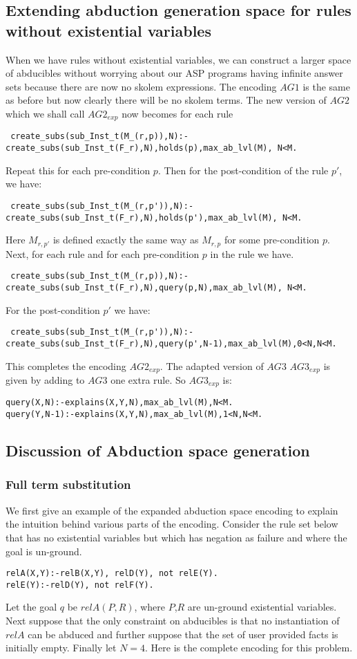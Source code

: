 \documentclass[sigconf]{acmart}
\begin{document}
\subsection{Extending abduction generation space for rules without existential variables}
When we have rules without existential variables, we can construct a larger space of abducibles without worrying about our ASP programs having infinite answer sets because there are now no skolem expressions. The encoding $AG1$ is the same as before but now clearly there will be no skolem terms. The new version of $AG2$ which we shall call $AG2_{exp}$ now becomes for each rule
\begin{verbatim}
 create_subs(sub_Inst_t(M_(r,p)),N):-create_subs(sub_Inst_t(F_r),N),holds(p),max_ab_lvl(M), N<M.   
\end{verbatim}
Repeat this for each pre-condition $p$. Then for the post-condition of the rule $p'$, we have:
\begin{verbatim}
 create_subs(sub_Inst_t(M_(r,p')),N):-create_subs(sub_Inst_t(F_r),N),holds(p'),max_ab_lvl(M), N<M.   
\end{verbatim}
Here $M_{r,p'}$ is defined exactly the same way as $M_{r,p}$ for some pre-condition $p$. Next, for each rule and for each pre-condition $p$ in the rule we have.
\begin{verbatim}
 create_subs(sub_Inst_t(M_(r,p)),N):-create_subs(sub_Inst_t(F_r),N),query(p,N),max_ab_lvl(M), N<M.   
\end{verbatim}
For the post-condition $p'$ we have:
\begin{verbatim}
 create_subs(sub_Inst_t(M_(r,p')),N):-create_subs(sub_Inst_t(F_r),N),query(p',N-1),max_ab_lvl(M),0<N,N<M.   
\end{verbatim}
This completes the encoding $AG2_{exp}$. The adapted version of $AG3$ $AG3_{exp}$ is given by adding to $AG3$ one extra rule. So $AG3_{exp}$ is:
\begin{verbatim}
query(X,N):-explains(X,Y,N),max_ab_lvl(M),N<M.
query(Y,N-1):-explains(X,Y,N),max_ab_lvl(M),1<N,N<M.
\end{verbatim}
\subsection{Discussion of Abduction space generation}
\subsubsection{Full term substitution}
We first give an example of the expanded abduction space encoding to explain the intuition behind various parts of the encoding. Consider the rule set below that has no existential variables but which has negation as failure and where the goal is un-ground. 
\begin{verbatim}
relA(X,Y):-relB(X,Y), relD(Y), not relE(Y).
relE(Y):-relD(Y), not relF(Y).
\end{verbatim}
Let the goal $q$ be $relA(P,R)$, where $P$,$R$ are un-ground existential variables. Next suppose that the only constraint on abducibles is that no instantiation of $relA$ can be abduced and further suppose that the set of user provided facts is initially empty. Finally let $N=4$. Here is the complete encoding for this problem. 
\end{document}
